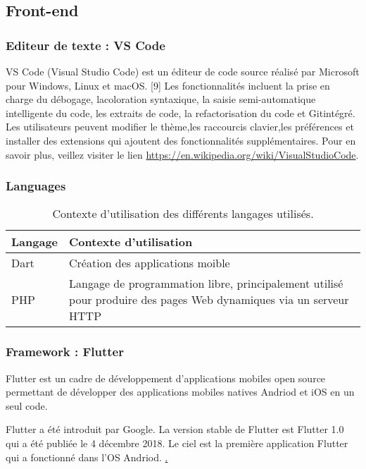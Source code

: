 \subsection{Front-end}
\subsubsection{Editeur de texte : VS Code}
VS Code (Visual Studio Code) est un éditeur de code source réalisé par Microsoft pour Windows, Linux et macOS. [9] Les fonctionnalités incluent la prise en charge du débogage, lacoloration syntaxique, la saisie semi-automatique intelligente du code, les extraits de code, la refactorisation du code et Gitintégré. Les utilisateurs peuvent modifier le thème,les raccourcis clavier,les préférences et installer des extensions qui ajoutent des fonctionnalités supplémentaires. Pour en savoir plus, veillez visiter le lien \href{https://en.wikipedia.org/wiki/Visual_Studio_Code}{https://en.wikipedia.org/wiki/VisualStudioCode}.
\subsubsection{Languages}
\begin{table}[h]
	\begin{tabular}{|m{6cm}|m{10cm}|}
		\hline
		\textbf{Langage} & \textbf{Contexte d’utilisation} \\
		\hline
		Dart & Création des applications moible\\
		\hline
		PHP  & Langage de programmation libre, principalement utilisé pour produire des pages Web dynamiques via un serveur HTTP\\
		\hline
		
	\end{tabular}
	\caption{Contexte d’utilisation des différents langages utilisés.}
\end{table}
\subsubsection{Framework : Flutter}
\label{Flutter}
Flutter est un cadre de développement d’applications mobiles open source permettant de développer des applications mobiles natives Andriod et iOS en un seul code.

Flutter a été introduit par Google. La version stable de Flutter est Flutter 1.0 qui a été publiée le 4 décembre 2018. Le ciel est la première application Flutter qui a fonctionné dans l’OS Andriod. \href{https://www.claudebueno.com/technologies/introduction-a-flutter.htm}.
